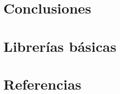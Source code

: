 \documentclass[11pt, a4paper,spanish]{article}
\begin{document}
    

    
    \thispagestyle{empty}
    \tableofcontents
    \pagebreak


	


	
	

	
	

	

    \section{Conclusiones}
%	
    \pagebreak
    
    \section{Librerías básicas}
%	
    \pagebreak

    \section{Referencias}
%	
    \pagebreak
\end{document}
